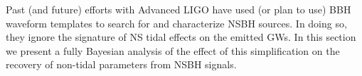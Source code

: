\documentclass[aps,prd,amsmath,floats,floatfix, twocolumn,
superscriptaddress,nofootinbib,showpacs]{revtex4-1}
\newcommand{\lambdans}{\Lambda_\mathrm{NS}}
\begin{document}
% 
% 
Past (and future) efforts with Advanced LIGO have used (or plan to use) BBH
waveform templates to search for and characterize NSBH sources. In doing so,
they ignore the signature of NS tidal effects on the emitted GWs. In this
section we present a fully Bayesian analysis of the effect of this
simplification on the recovery of non-tidal parameters from NSBH signals.
\end{document}
